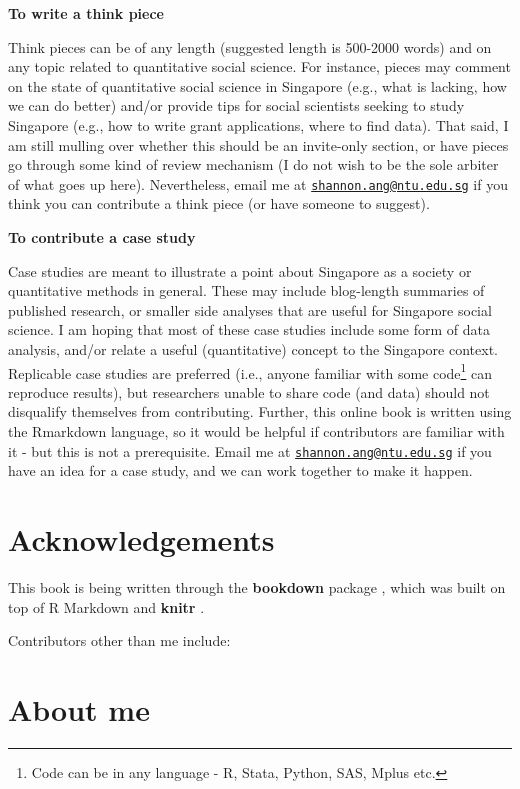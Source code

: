 \documentclass[openany]{book}
\let\rmarkdownfootnote\footnote%
\def\footnote{\protect\rmarkdownfootnote}
\begin{document}
\textbf{To write a think piece}

Think pieces can be of any length (suggested length is 500-2000 words)
and on any topic related to quantitative social science. For instance,
pieces may comment on the state of quantitative social science in
Singapore (e.g., what is lacking, how we can do better) and/or provide
tips for social scientists seeking to study Singapore (e.g., how to
write grant applications, where to find data). That said, I am still
mulling over whether this should be an invite-only section, or have
pieces go through some kind of review mechanism (I do not wish to be the
sole arbiter of what goes up here). Nevertheless, email me at
\href{mailto:shannon.ang@ntu.edu.sg}{\nolinkurl{shannon.ang@ntu.edu.sg}}
if you think you can contribute a think piece (or have someone to
suggest).

\textbf{To contribute a case study}

Case studies are meant to illustrate a point about Singapore as a
society or quantitative methods in general. These may include
blog-length summaries of published research, or smaller side analyses
that are useful for Singapore social science. I am hoping that most of
these case studies include some form of data analysis, and/or relate a
useful (quantitative) concept to the Singapore context. Replicable case
studies are preferred (i.e., anyone familiar with some code\footnote{Code
  can be in any language - R, Stata, Python, SAS, Mplus etc.} can
reproduce results), but researchers unable to share code (and data)
should not disqualify themselves from contributing. Further, this online
book is written using the Rmarkdown language, so it would be helpful if
contributors are familiar with it - but this is not a prerequisite.
Email me at
\href{mailto:shannon.ang@ntu.edu.sg}{\nolinkurl{shannon.ang@ntu.edu.sg}}
if you have an idea for a case study, and we can work together to make
it happen.

\section*{Acknowledgements}\label{acknowledgements}

This book is being written through the \textbf{bookdown} package
\citep{R-bookdown}, which was built on top of R Markdown and
\textbf{knitr} \citep{xie2015}.

Contributors other than me include:

\section*{About me}\label{about-me}
\end{document}
